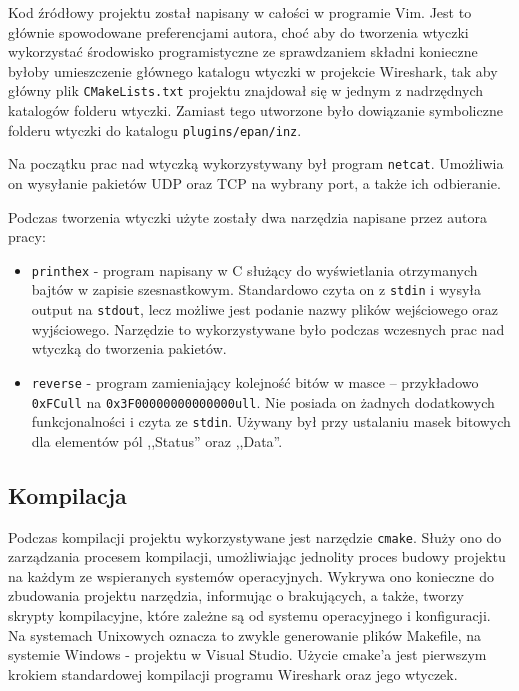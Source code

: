 \documentclass[a4paper, 12pt, twoside, openright]{article}
\begin{document}
	Kod źródłowy projektu został napisany w całości w programie Vim. Jest to głównie spowodowane preferencjami autora,
	choć aby do tworzenia wtyczki wykorzystać środowisko programistyczne ze sprawdzaniem składni konieczne byłoby umieszczenie
	głównego katalogu wtyczki w projekcie Wireshark, tak aby główny plik \texttt{CMakeLists.txt} projektu znajdował się w jednym
	z nadrzędnych katalogów folderu wtyczki. Zamiast tego utworzone było dowiązanie symboliczne folderu wtyczki do katalogu
	\texttt{plugins/epan/inz}.

	Na początku prac nad wtyczką wykorzystywany był program \texttt{netcat}. Umożliwia on wysyłanie pakietów
	UDP oraz TCP na wybrany port, a także ich odbieranie.

	Podczas tworzenia wtyczki użyte zostały dwa narzędzia napisane przez autora pracy:
	\begin{itemize}
		\item \texttt{printhex} - program napisany w C służący do wyświetlania otrzymanych bajtów w zapisie szesnastkowym. Standardowo
			czyta on z \texttt{stdin} i wysyła output na \texttt{stdout}, lecz możliwe jest podanie nazwy plików wejściowego oraz wyjściowego. Narzędzie
			to wykorzystywane było podczas wczesnych prac nad wtyczką do tworzenia pakietów.
		\item \texttt{reverse} - program zamieniający kolejność bitów w masce -- przykładowo \texttt{0xFCull} na \texttt{0x3F00000000000000ull}.
			Nie posiada on żadnych dodatkowych funkcjonalności i czyta ze \texttt{stdin}. Używany był przy ustalaniu masek bitowych dla elementów pól
			,,Status'' oraz ,,Data''.
	\end{itemize}

\subsection{Kompilacja}

	\indent\par
	Podczas kompilacji projektu wykorzystywane jest narzędzie \texttt{cmake}. Służy ono do zarządzania procesem kompilacji,
	umożliwiając jednolity proces budowy projektu
	na każdym ze wspieranych systemów operacyjnych. Wykrywa ono konieczne do zbudowania projektu narzędzia, informując
	o brakujących, a także, tworzy skrypty kompilacyjne, które zależne są od systemu operacyjnego i konfiguracji. Na systemach Unixowych
	oznacza to zwykle generowanie plików Makefile, na systemie Windows - projektu w Visual Studio. Użycie cmake'a
	jest pierwszym krokiem standardowej kompilacji programu Wireshark oraz jego wtyczek.
	
\end{document}
